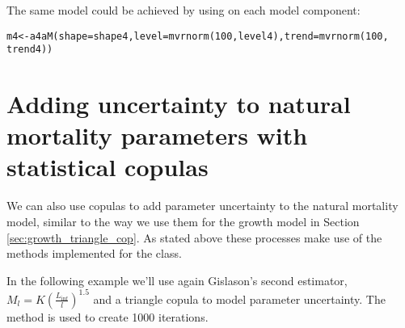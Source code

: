 \documentclass[a4paper,english,10pt]{article}\usepackage[]{graphicx}\usepackage[]{color}
\makeatletter
\newcommand{\hlnum}[1]{\textcolor[rgb]{0.063,0.58,0.627}{#1}}%
\newcommand{\hlstd}[1]{\textcolor[rgb]{0.196,0.196,0.196}{#1}}%
\newcommand{\hlkwb}[1]{\textcolor[rgb]{0.627,0,0.314}{#1}}%
\newcommand{\hlkwc}[1]{\textcolor[rgb]{0,0.631,0.314}{#1}}%
\newcommand{\hlkwd}[1]{\textcolor[rgb]{0.78,0.227,0.412}{#1}}%
\newenvironment{kframe}{%
 \def\at@end@of@kframe{}%
 \ifinner\ifhmode%
  \def\at@end@of@kframe{\end{minipage}}%
  \begin{minipage}{\columnwidth}%
 \fi\fi%
 \def\FrameCommand##1{\hskip\@totalleftmargin \hskip-\fboxsep
 \colorbox{shadecolor}{##1}\hskip-\fboxsep
     \hskip-\linewidth \hskip-\@totalleftmargin \hskip\columnwidth}%
 \MakeFramed {\advance\hsize-\width
   \@totalleftmargin\z@ \linewidth\hsize
   \@setminipage}}%
 {\par\unskip\endMakeFramed%
 \at@end@of@kframe}
\newenvironment{knitrout}{}{} %
\makeatother
\begin{document}
The same model could be achieved by using  on each model component:

\begin{knitrout}
\color{fgcolor}\begin{kframe}
\begin{alltt}
\hlstd{m4} \hlkwb{<-} \hlkwd{a4aM}\hlstd{(}\hlkwc{shape} \hlstd{= shape4,} \hlkwc{level} \hlstd{=} \hlkwd{mvrnorm}\hlstd{(}\hlnum{100}\hlstd{, level4),} \hlkwc{trend} \hlstd{=} \hlkwd{mvrnorm}\hlstd{(}\hlnum{100}\hlstd{,}
    \hlstd{trend4))}
\end{alltt}
\end{kframe}
\end{knitrout}


\section{Adding uncertainty to natural mortality parameters with statistical copulas}

We can also use copulas to add parameter uncertainty to the natural mortality model, similar to the way we use them for the growth model in Section \ref{sec:growth_triangle_cop}. As stated above these processes make use of the methods implemented for the  class.


In the following example we'll use again Gislason's second estimator, $M_l=K(\frac{L_{\inf}}{l})^{1.5}$ and a triangle copula to model parameter uncertainty. The method  is used to create 1000 iterations. 
\end{document}
